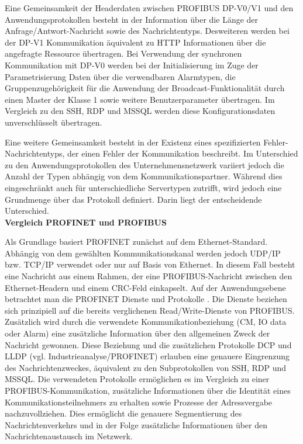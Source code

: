 Eine Gemeinsamkeit der Headerdaten zwischen PROFIBUS DP-V0/V1 und den Anwendungsprotokollen besteht in der Information über die Länge der Anfrage/Antwort-Nachricht sowie des Nachrichtentyps. Desweiteren werden bei der DP-V1 Kommunikation äquivalent zu HTTP Informationen über die angefragte Ressource übertragen. 
Bei Verwendung der synchronen Kommunikation mit DP-V0 werden bei der Initialisierung im Zuge der Parametrisierung Daten über die verwendbaren Alarmtypen, die Gruppenzugehörigkeit für die Anwendung der Broadcast-Funktionalität durch einen Master der Klasse 1 sowie weitere Benutzerparameter übertragen. 
Im Vergleich zu den SSH, RDP und MSSQL werden diese Konfigurationsdaten unverschlüsselt übertragen. 

Eine weitere Gemeinsamkeit besteht in der Existenz eines spezifizierten Fehler-Nachrichtentyps, der einen Fehler der Kommunikation beschreibt. Im Unterschied zu den Anwendungsprotokollen des Unternehmensnetzwerk variiert jedoch die Anzahl der Typen abhängig von dem Kommunikationspartner. Während dies eingeschränkt auch für unterschiedliche Servertypen zutrifft, wird jedoch eine Grundmenge über das Protokoll definiert. Darin liegt der entscheidende Unterschied.\\


\textbf{Vergleich PROFINET und PROFIBUS}

Als Grundlage basiert PROFINET zunächst auf dem Ethernet-Standard. Abhängig von dem gewählten Kommunikationskanal werden jedoch UDP/IP bzw. TCP/IP verwendet oder nur auf Basis von Ethernet. In diesem Fall besteht eine Nachricht aus einem Rahmen, der eine PROFIBUS-Nachricht zwischen den Ethernet-Headern und einem CRC-Feld einkapselt. Auf der Anwendungsebene betrachtet man die PROFINET Dienste und Protokolle \citep{PROFINET3}.
Die Dienste beziehen sich prinzipiell auf die bereits verglichenen Read/Write-Dienste von PROFIBUS. Zusätzlich wird durch die verwendete Kommunikationbeziehung (CM, IO data oder Alarm) eine zusätzliche Information über den allgemeinen Zweck der Nachricht gewonnen. Diese Beziehung und die zusätzlichen Protokolle DCP und LLDP (vgl. Industrieanalyse/PROFINET) erlauben eine genauere Eingrenzung des Nachrichtenzweckes, äquivalent zu den Subprotokollen von SSH, RDP und MSSQL. Die verwendeten Protokolle ermöglichen es im Vergleich zu einer PROFIBUS-Kommunikation, zusätzliche Informationen über die Identität eines Kommunikationsteilnehmers zu erhalten sowie Prozesse der Adressvergabe nachzuvollziehen. Dies ermöglicht die genauere Segmentierung des Nachrichtenverkehrs und in der Folge zusätzliche Informationen über den Nachrichtenaustausch im Netzwerk.

